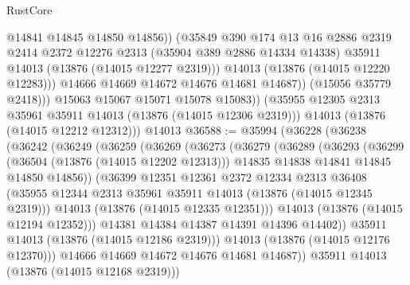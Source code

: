 \begin{lexlean}{RustCore}
\begin{coremodule}
                        @14841
                        @14845
                        @14850
                        @14856))
                    (@35849
                      @390
                      @174
                      @13
                      @16
                      @2886
                      @2319
                      @2414
                      @2372
                      @12276
                      @2313
                      (@35904 @389 @2886 @14334 @14338)
                      @35911
                      @14013
                      (@13876 (@14015 @12277 @2319)))
                    @14013
                    (@13876 (@14015 @12220 @12283)))
                  @14666
                  @14669
                  @14672
                  @14676
                  @14681
                  @14687))
              (@15056 @35779 @2418)))
          @15063
          @15067
          @15071
          @15078
          @15083))
      (@35955 @12305 @2313 @35961 @35911 @14013 (@13876 (@14015 @12306 @2319)))
      @14013
      (@13876 (@14015 @12212 @12312)))
    @14013
@36588 := @35994
    (@36228
      (@36238
        (@36242
          (@36249
            (@36259
              (@36269
                (@36273
                  (@36279
                    (@36289
                      (@36293
                        (@36299
                          (@36504 (@13876 (@14015 @12202 @12313)))
                          @14835
                          @14838
                          @14841
                          @14845
                          @14850
                          @14856))
                      (@36399
                        @12351
                        @12361
                        @2372
                        @12334
                        @2313
                        @36408
                        (@35955 @12344 @2313 @35961 @35911 @14013 (@13876 (@14015 @12345 @2319)))
                        @14013
                        (@13876 (@14015 @12335 @12351)))
                      @14013
                      (@13876 (@14015 @12194 @12352)))
                    @14381
                    @14384
                    @14387
                    @14391
                    @14396
                    @14402))
                @35911
                @14013
                (@13876 (@14015 @12186 @2319)))
              @14013
              (@13876 (@14015 @12176 @12370)))
            @14666
            @14669
            @14672
            @14676
            @14681
            @14687))
        @35911
        @14013
        (@13876 (@14015 @12168 @2319)))

\end{coremodule}
\end{lexlean}
